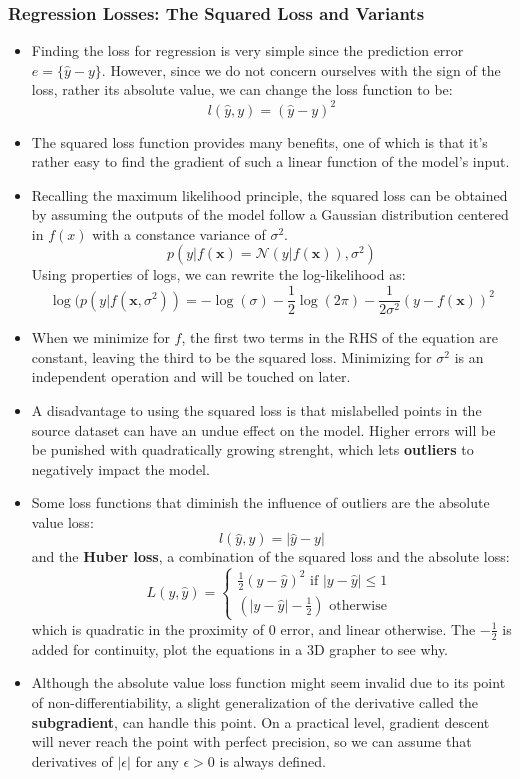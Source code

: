 \documentclass{article}
\newcommand{\tbf}[1]{\textbf{#1}}
\newcommand{\mbf}[1]{\mathbf{#1}}
\begin{document}
    \subsubsection{Regression Losses: The Squared Loss and Variants}
    \begin{itemize}
        \item Finding the loss for regression is very simple since the prediction error $e = \{\hat{y} - y\}$. However, since we do not concern ourselves 
        with the sign of the loss, rather its absolute value, we can change the loss function to be:
        \[l(\hat{y},y) = (\hat{y}-y)^2\]
        \item The squared loss function provides many benefits, one of which is that it's rather easy to find the gradient of such a linear function of the model's input.
        \item Recalling the maximum likelihood principle, the squared loss can be obtained by assuming the outputs of the model follow a Gaussian distribution
        centered in $f(x)$ with a constance variance of $\sigma^2$.
        \[p(y|f(\mbf{x}) = \mathcal{N}(y|f(\mbf{x})), \sigma^2)\]
        Using properties of logs, we can rewrite the log-likelihood as:
        \[\log(p(y|f(\mbf{x}, \sigma^2)) = -\log(\sigma)-\frac{1}{2}\log(2 \pi) - \frac{1}{2\sigma^2}(y-f(\mbf{x}))^2\]
        \item When we minimize for $f$, the first two terms in the RHS of the equation are constant, leaving the third to be the squared loss.
        Minimizing for $\sigma^2$ is an independent operation and will be touched on later.
        \item A disadvantage to using the squared loss is that mislabelled points in the source dataset can have an undue effect on the model.
        Higher errors will be be punished with quadratically growing strenght, which lets \tbf{outliers} to negatively impact the model.
        \item Some loss functions that diminish the influence of outliers are the absolute value loss:
        \[l(\hat{y},y) = |\hat{y}-y|\]
        and the \tbf{Huber loss}, a combination of the squared loss and the absolute loss:
        \[
        L(y, \hat{y}) = 
        \begin{cases}
            \frac{1}{2}(y-\hat{y})^2 \text{ if } |y-\hat{y}| \leq 1\\
            (|y-\hat{y}|-\frac{1}{2}) \text{ otherwise }
        \end{cases}
        \]
        which is quadratic in the proximity of 0 error, and linear otherwise. The $-\frac{1}{2}$ is added for continuity, plot the equations in a 3D grapher to see why.
        \item Although the absolute value loss function might seem invalid due to its point of non-differentiability, a slight generalization of the
        derivative called the \tbf{subgradient}, can handle this point. On a practical level, gradient descent will never reach the point with
        perfect precision, so we can assume that derivatives of $|\epsilon|$ for any $\epsilon>0$ is always defined.
    \end{itemize}
\end{document}

